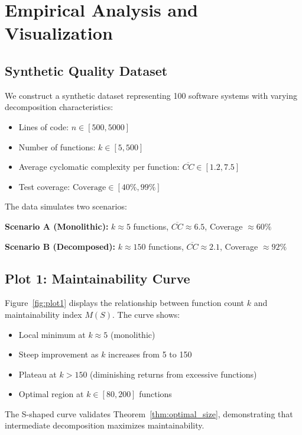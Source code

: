\documentclass[a4paper,12pt]{article}
\theoremstyle{definition}
\begin{document}
\section{Empirical Analysis and Visualization}

\subsection{Synthetic Quality Dataset}

We construct a synthetic dataset representing 100 software systems with varying decomposition characteristics:

\begin{itemize}
	\item Lines of code: $n \in [500, 5000]$
	\item Number of functions: $k \in [5, 500]$
	\item Average cyclomatic complexity per function: $\overline{CC} \in [1.2, 7.5]$
	\item Test coverage: $\text{Coverage} \in [40\%, 99\%]$
\end{itemize}

The data simulates two scenarios:

\textbf{Scenario A (Monolithic):} $k \approx 5$ functions, $\overline{CC} \approx 6.5$, Coverage $\approx 60\%$

\textbf{Scenario B (Decomposed):} $k \approx 150$ functions, $\overline{CC} \approx 2.1$, Coverage $\approx 92\%$

\subsection{Plot 1: Maintainability Curve}

Figure~\ref{fig:plot1} displays the relationship between function count $k$ and maintainability index $M(S)$. The curve shows:

\begin{itemize}
	\item Local minimum at $k \approx 5$ (monolithic)
	\item Steep improvement as $k$ increases from 5 to 150
	\item Plateau at $k > 150$ (diminishing returns from excessive functions)
	\item Optimal region at $k \in [80, 200]$ functions
\end{itemize}

The S-shaped curve validates Theorem~\ref{thm:optimal_size}, demonstrating that intermediate decomposition maximizes maintainability.
\end{document}
